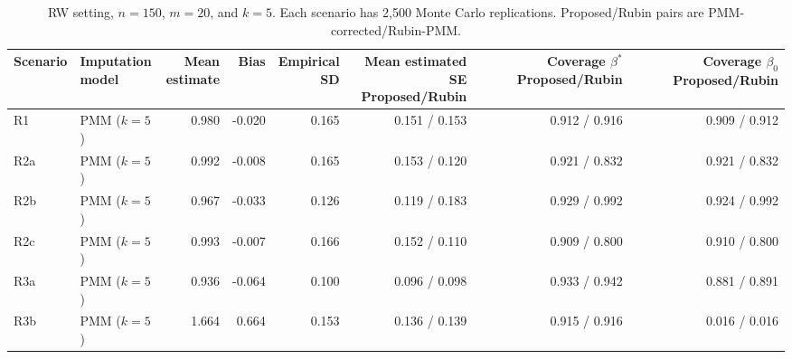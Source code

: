 \documentclass[11pt]{article}
\begin{document}
\clearpage
\begin{table}[H]
\centering
\scriptsize
\setlength{\tabcolsep}{3.2pt}
\begin{tabular}{llrrrrrr}
\toprule
Scenario & \makecell{Imputation\\model} & \makecell{Mean\\estimate} & Bias &
\makecell{Empirical\\SD} & \makecell{Mean estimated SE\\Proposed/Rubin} &
\makecell{Coverage $\beta^\ast$\\Proposed/Rubin} &
\makecell{Coverage $\beta_0$\\Proposed/Rubin} \\
\midrule
R1 & PMM ($k=5$) & 0.980 & -0.020 & 0.165 & 0.151 / 0.153 & 0.912 / 0.916 & 0.909 / 0.912 \\
R2a & PMM ($k=5$) & 0.992 & -0.008 & 0.165 & 0.153 / 0.120 & 0.921 / 0.832 & 0.921 / 0.832 \\
R2b & PMM ($k=5$) & 0.967 & -0.033 & 0.126 & 0.119 / 0.183 & 0.929 / 0.992 & 0.924 / 0.992 \\
R2c & PMM ($k=5$) & 0.993 & -0.007 & 0.166 & 0.152 / 0.110 & 0.909 / 0.800 & 0.910 / 0.800 \\
R3a & PMM ($k=5$) & 0.936 & -0.064 & 0.100 & 0.096 / 0.098 & 0.933 / 0.942 & 0.881 / 0.891 \\
R3b & PMM ($k=5$) & 1.664 & 0.664 & 0.153 & 0.136 / 0.139 & 0.915 / 0.916 & 0.016 / 0.016 \\
\bottomrule
\end{tabular}
\caption{RW setting, $n=150$, $m=20$, and $k=5$. Each scenario has 2,500 Monte Carlo replications. Proposed/Rubin pairs are PMM-corrected/Rubin-PMM.}
\end{table}
\end{document}
